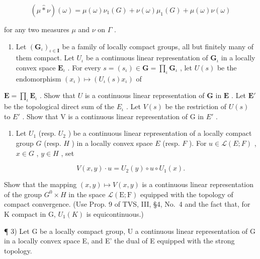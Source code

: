 \[
(\mu \widehat {*} \nu) (\omega) = \mu (\omega) \nu_ {1} (G) + \nu (\omega) \mu_ {1} (G) + \mu (\omega) \nu (\omega)
\]

for any two measures \(\mu\) and \(\nu\) on \(\Gamma\) .

\exercisesection{}

\begin{enumerate}
\def\labelenumi{\arabic{enumi})}
\tightlist
\item
  Let \((\mathbf{G}_{\iota})_{\iota \in \mathbf{I}}\) be a family of locally compact groups, all but finitely many of them compact. Let \(U_{\iota}\) be a continuous linear representation of \(\mathbf{G}_{\iota}\) in a locally convex space \(\mathbf{E}_{\iota}\) . For every \(s = (s_{\iota}) \in \mathbf{G} = \prod_{\iota} \mathbf{G}_{\iota}\) , let \(U(s)\) be the endomorphism \((x_{\iota}) \mapsto (U_{\iota}(s)x_{\iota})\) of
\end{enumerate}

\(\mathbf{E} = \prod_{\iota}\mathbf{E}_{\iota}\) . Show that \(U\) is a continuous linear representation of \(\mathbf{G}\) in \(\mathbf{E}\) . Let \(\mathbf{E}'\) be the topological direct sum of the \(E_{\iota}\) . Let \(V(s)\) be the restriction of \(U(s)\) to \(E'\) . Show that V is a continuous linear representation of G in \(E'\) .

\begin{enumerate}
\def\labelenumi{\arabic{enumi})}
\setcounter{enumi}{1}
\tightlist
\item
  Let \(U_{1}\) (resp. \(U_{2}\) ) be a continuous linear representation of a locally compact group \(G\) (resp. \(H\) ) in a locally convex space \(E\) (resp. \(F\) ). For \(u \in \mathcal{L}(E; F)\) , \(x \in G\) , \(y \in H\) , set
\end{enumerate}

\[
V (x, y) \cdot u = U _ {2} (y) \circ u \circ U _ {1} (x).
\]

Show that the mapping \((x,y)\mapsto V(x,y)\) is a continuous linear representation of the group \(G^{0}\times H\) in the space \(\mathcal{L}(\mathrm{E};\mathrm{F})\) equipped with the topology of compact convergence. (Use Prop. 9 of TVS, III, §4, No.~4 and the fact that, for K compact in G, \(U_{1}(K)\) is equicontinuous.)

¶ 3) Let G be a locally compact group, U a continuous linear representation of G in a locally convex space E, and E' the dual of E equipped with the strong topology.

